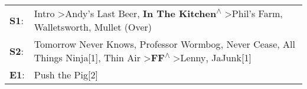 \begin{supertabular}{p{0.03\textwidth}p{0.92\textwidth}}
 \textbf{S1}:  &                                                                                Intro\textsuperscript{} \textgreater \enspace Andy's Last Beer\textsuperscript{}, \enspace \textbf{In The Kitchen\textsuperscript{$\wedge$}} \textgreater \enspace Phil's Farm\textsuperscript{}, \enspace Walletsworth\textsuperscript{}, \enspace Mullet (Over)\textsuperscript{}  \enspace  \\
 \textbf{S2}:  &  Tomorrow Never Knows\textsuperscript{}, \enspace Professor Wormbog\textsuperscript{}, \enspace Never Cease\textsuperscript{}, \enspace All Things Ninja[1]\textsuperscript{}, \enspace Thin Air\textsuperscript{} \textgreater \enspace \textbf{FF\textsuperscript{$\wedge$}} \textgreater \enspace Lenny\textsuperscript{}, \enspace JaJunk[1]\textsuperscript{}  \enspace  \\
 \textbf{E1}:  &                                                                                                                                                                                                                                                                                                                                  Push the Pig[2]\textsuperscript{}  \enspace  \\
\end{supertabular}
